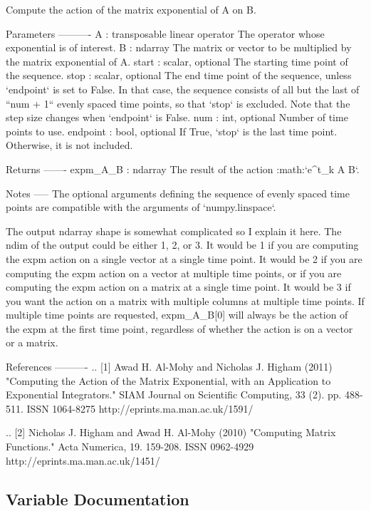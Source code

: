 \begin{DoxyVerb}Compute the action of the matrix exponential of A on B.

Parameters
----------
A : transposable linear operator
    The operator whose exponential is of interest.
B : ndarray
    The matrix or vector to be multiplied by the matrix exponential of A.
start : scalar, optional
    The starting time point of the sequence.
stop : scalar, optional
    The end time point of the sequence, unless `endpoint` is set to False.
    In that case, the sequence consists of all but the last of ``num + 1``
    evenly spaced time points, so that `stop` is excluded.
    Note that the step size changes when `endpoint` is False.
num : int, optional
    Number of time points to use.
endpoint : bool, optional
    If True, `stop` is the last time point.  Otherwise, it is not included.

Returns
-------
expm_A_B : ndarray
     The result of the action :math:`e^{t_k A} B`.

Notes
-----
The optional arguments defining the sequence of evenly spaced time points
are compatible with the arguments of `numpy.linspace`.

The output ndarray shape is somewhat complicated so I explain it here.
The ndim of the output could be either 1, 2, or 3.
It would be 1 if you are computing the expm action on a single vector
at a single time point.
It would be 2 if you are computing the expm action on a vector
at multiple time points, or if you are computing the expm action
on a matrix at a single time point.
It would be 3 if you want the action on a matrix with multiple
columns at multiple time points.
If multiple time points are requested, expm_A_B[0] will always
be the action of the expm at the first time point,
regardless of whether the action is on a vector or a matrix.

References
----------
.. [1] Awad H. Al-Mohy and Nicholas J. Higham (2011)
       "Computing the Action of the Matrix Exponential,
       with an Application to Exponential Integrators."
       SIAM Journal on Scientific Computing,
       33 (2). pp. 488-511. ISSN 1064-8275
       http://eprints.ma.man.ac.uk/1591/

.. [2] Nicholas J. Higham and Awad H. Al-Mohy (2010)
       "Computing Matrix Functions."
       Acta Numerica,
       19. 159-208. ISSN 0962-4929
       http://eprints.ma.man.ac.uk/1451/\end{DoxyVerb}
 

\subsection{Variable Documentation}
\hypertarget{namespacescipy_1_1sparse_1_1linalg_1_1__expm__multiply_a8e3a3e9b4bc49291b5005df471e1ca61}{}
